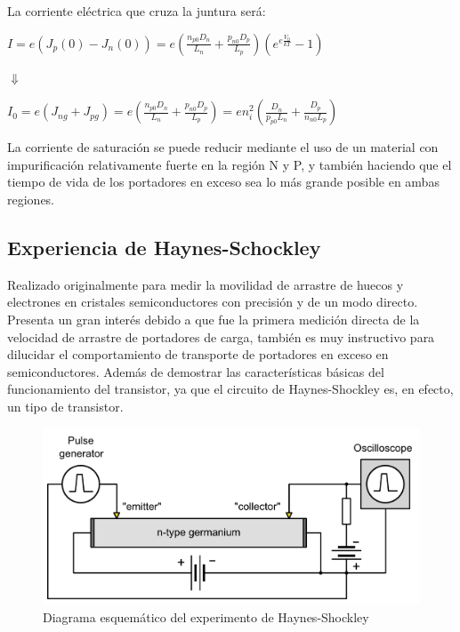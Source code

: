 \documentclass[oneside]{book}
\numberwithin{equation}{section}
\numberwithin{figure}{section}
\numberwithin{table}{section}
\begin{document}
				La corriente eléctrica que cruza la juntura será:
				
				\begin{center}
					$\displaystyle I=e\left(J_p(0)-J_n(0)\right)=e\left(\frac{n_{p0}D_n}{L_n}+\frac{p_{n0}D_p}{L_p}\right)\left(e^{e\frac{V_0}{kT}}-1\right)$
					
					$\Downarrow$
					
					$\displaystyle I_0=e\left(J_{ng}+J_{pg}\right)=e\left(\frac{n_{p0}D_n}{L_n}+\frac{p_{n0}D_p}{L_p}\right)=e n_i^2\left(\frac{D_n}{p_{p0}L_n}+\frac{D_p}{n_{n0}L_p}\right)$
				\end{center}
		
				La corriente de saturación se puede reducir mediante el uso de un material con impurificación relativamente fuerte en la región N y P, y también haciendo que el tiempo de vida de los portadores en exceso sea lo más grande posible en ambas regiones.\\
	
			\subsection{Experiencia de Haynes-Schockley}
				
				Realizado originalmente para medir la movilidad de arrastre de huecos y electrones en cristales semiconductores con precisión y de un modo directo. Presenta un gran interés debido a que fue la primera medición directa de la velocidad de arrastre de portadores de carga, también es muy instructivo para dilucidar el comportamiento de transporte de portadores en exceso en semiconductores. Además de demostrar las características básicas del funcionamiento del transistor, ya que el circuito de Haynes-Shockley es, en efecto, un tipo de transistor.
				
				\begin{figure}[H]
					\begin{center}
						\includegraphics[scale=0.45]{Haynes-Shockley.png}
						\caption{Diagrama esquemático del experimento de Haynes-Shockley}
					\end{center}
				\end{figure}					
							
\end{document}
